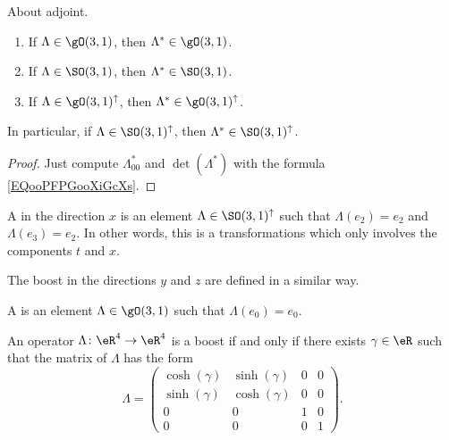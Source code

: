 \begin{lemma}       \label{LEMooLJMMooOXCyOl}
	About adjoint.
	\begin{enumerate}
		\item
		      If \( \Lambda\in \gO(3,1)\), then \( \Lambda^*\in \gO(3,1)\).
		\item
		      If \( \Lambda\in \SO(3,1)\), then \( \Lambda^*\in \SO(3,1)\).
		\item
		      If \( \Lambda\in \gO(3,1)^{\uparrow}\), then \( \Lambda^*\in \gO(3,1)^{\uparrow}\).
	\end{enumerate}
	In particular, if \( \Lambda\in \SO(3,1)^{\uparrow}\), then \( \Lambda^*\in \SO(3,1)^{\uparrow}\).
\end{lemma}

\begin{proof}
	Just compute \( \Lambda^*_{00}\) and \( \det(\Lambda^*)\) with the formula \eqref{EQooPFPGooXiGcXs}.
\end{proof}

\begin{definition}          \label{DEFooVQLPooWyINoc}
	A  in the direction \( x\) is an element \( \Lambda\in \SO(3,1)^{\uparrow}\) such that \( \Lambda(e_2)=e_2\) and \( \Lambda(e_3)=e_2\). In other words, this is a transformations which only involves the components \( t\) and \( x\).

	The boost in the directions \( y\) and \( z\) are defined in a similar way.

	A  is an element \( \Lambda\in \gO(3,1)\) such that \( \Lambda(e_0)=e_0\).
\end{definition}

\begin{lemma}
	An operator \( \Lambda\colon \eR^4\to \eR^4\) is a boost if and only if there exists \( \gamma\in \eR\) such that the matrix of \( \Lambda\) has the form
	\begin{equation}
		\Lambda=\begin{pmatrix}
			\cosh(\gamma) & \sinh(\gamma) & 0 & 0 \\
			\sinh(\gamma) & \cosh(\gamma) & 0 & 0 \\
			0             & 0             & 1 & 0 \\
			0             & 0             & 0 & 1
		\end{pmatrix}.
	\end{equation}
\end{lemma}

